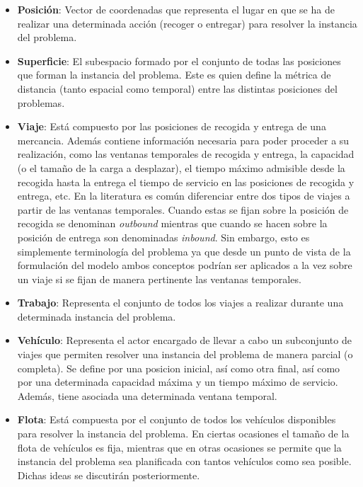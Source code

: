 \documentclass{subfiles}
\begin{document}
        \begin{itemize}

          \item \textbf{Posición}: Vector de coordenadas que representa el lugar en que se ha de realizar una determinada acción (recoger o entregar) para resolver la instancia del problema.

          \item \textbf{Superficie}: El subespacio formado por el conjunto de todas las posiciones que forman la instancia del problema. Este es quien define la métrica de distancia (tanto espacial como temporal) entre las distintas posiciones del problemas.

          \item \textbf{Viaje}: Está compuesto por las posiciones de recogida y entrega de una mercancia. Además contiene información necesaria para poder proceder a su realización, como las ventanas temporales de recogida y entrega, la capacidad (o el tamaño de la carga a desplazar), el tiempo máximo admisible desde la recogida hasta la entrega el tiempo de servicio en las posiciones de recogida y entrega, etc. En la literatura es común diferenciar entre dos tipos de viajes a partir de las ventanas temporales. Cuando estas se fijan sobre la posición de recogida se denominan \emph{outbound} mientras que cuando se hacen sobre la posición de entrega son denominadas \emph{inbound}. Sin embargo, esto es simplemente terminología del problema ya que desde un punto de vista de la formulación del modelo ambos conceptos podrían ser aplicados a la vez sobre un viaje si se fijan de manera pertinente las ventanas temporales.

          \item \textbf{Trabajo}: Representa el conjunto de todos los viajes a realizar durante una determinada instancia del problema.

          \item \textbf{Vehículo}: Representa el actor encargado de llevar a cabo un subconjunto de viajes que permiten resolver una instancia del problema de manera parcial (o completa). Se define por una posicion inicial, así como otra final, así como por una determinada capacidad máxima y un tiempo máximo de servicio. Además, tiene asociada una determinada ventana temporal.

          \item \textbf{Flota}: Está compuesta por el conjunto de todos los vehículos disponibles para resolver la instancia del problema. En ciertas ocasiones el tamaño de la flota de vehículos es fija, mientras que en otras ocasiones se permite que la instancia del problema sea planificada con tantos vehículos como sea posible. Dichas ideas se discutirán posteriormente.


\end{itemize}
\end{document}
